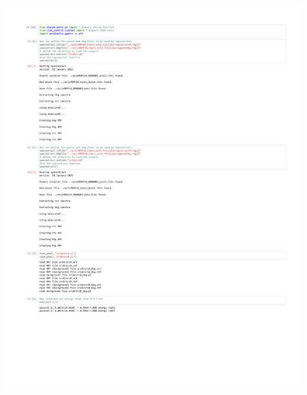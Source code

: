 \documentclass[12pt]{report}
\begin{document}
\includegraphics[scale=0.75,page=5]{Images/blake_src1.pdf}





\clearpage
\end{document}
